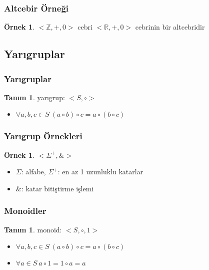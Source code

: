 \documentclass[dvipsnames]{beamer}
\theoremstyle{definition}
\newtheorem{tanim}[theorem]{Tanım}
\theoremstyle{example}
\newtheorem{ornek}[theorem]{Örnek}
\theoremstyle{plain}
\begin{document}
\begin{frame}
  \frametitle{Altcebir Örneği}

  \begin{ornek}
    $<\mathbb{Z},+,0>$ cebri
    $<\mathbb{R},+,0>$ cebrinin bir altcebridir
  \end{ornek}
\end{frame}

\subsection{Yarıgruplar}

\begin{frame}
  \frametitle{Yarıgruplar}

  \begin{tanim}
    \alert{yarıgrup}: $<S,\circ>$
    \begin{itemize}
      \item $\forall a,b,c \in S~(a \circ b) \circ c = a \circ (b \circ c)$
    \end{itemize}
  \end{tanim}
\end{frame}

\begin{frame}
  \frametitle{Yarıgrup Örnekleri}

  \begin{ornek}
    $<\Sigma^+,\&>$

    \begin{itemize}
      \item $\Sigma$: alfabe, $\Sigma^+$: en az 1 uzunluklu katarlar
      \item $\&$: katar bitiştirme işlemi
    \end{itemize}
  \end{ornek}
\end{frame}

\begin{frame}
  \frametitle{Monoidler}

  \begin{tanim}
    \alert{monoid}: $<S,\circ,1>$

    \begin{itemize}
      \item $\forall a,b,c \in S~(a \circ b) \circ c = a \circ (b \circ c)$
      \item $\forall a \in S~a \circ 1 = 1 \circ a = a$
    \end{itemize}
  \end{tanim}
\end{frame}
\end{document}
